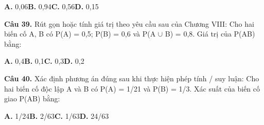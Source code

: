 \documentclass[11pt,a4paper]{article}
\begin{document}
\hspace*{1.5em}\textbf{A.} 0,06\quad\quad \textbf{B.} 0,94\quad\quad \textbf{C.} 0,56\quad\quad \textbf{D.} 0,15\par\vspace{2pt}
\textbf{\color{primary} Câu 39.} Rút gọn hoặc tính giá trị theo yêu cầu sau của Chương VIII: Cho hai biến cố A, B có P(A) = 0,5; P(B) = 0,6 và P(A $\cup$ B) = 0,8. Giá trị của P(AB) bằng:\par
\hspace*{1.5em}\textbf{A.} 0,4\quad\quad \textbf{B.} 0,1\quad\quad \textbf{C.} 0,3\quad\quad \textbf{D.} 0,2\par\vspace{2pt}
\textbf{\color{primary} Câu 40.} Xác định phương án đúng sau khi thực hiện phép tính / suy luận: Cho hai biến cố độc lập A và B có P(A) = 1/21 và P(B) = 1/3. Xác suất của biến cố giao P(AB) bằng:\par
\hspace*{1.5em}\textbf{A.} 1/24\quad\quad \textbf{B.} 2/63\quad\quad \textbf{C.} 1/63\quad\quad \textbf{D.} 24/63\par\vspace{2pt}
\end{document}
